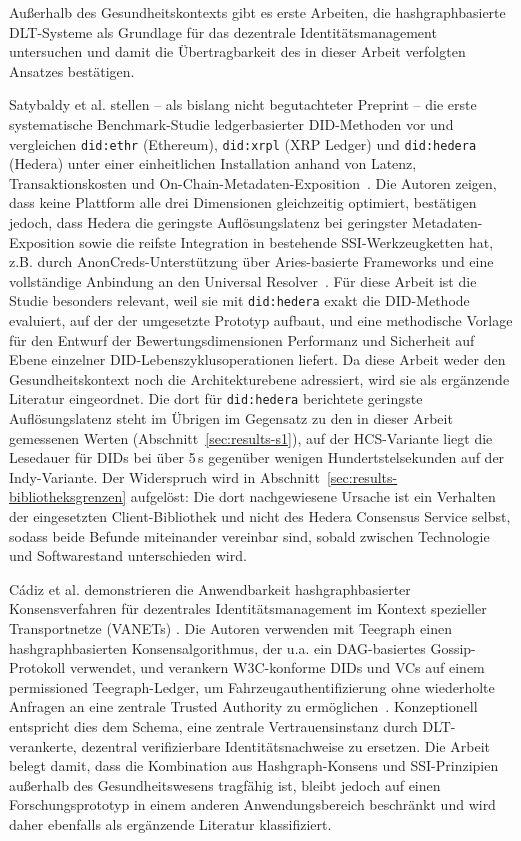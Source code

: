 Außerhalb des Gesundheitskontexts gibt es erste Arbeiten, die hashgraphbasierte DLT-Systeme als Grundlage für das dezentrale Identitätsmanagement untersuchen und damit die Übertragbarkeit des in dieser Arbeit verfolgten Ansatzes bestätigen.

Satybaldy et al. stellen -- als bislang nicht begutachteter Preprint -- die erste systematische Benchmark-Studie ledgerbasierter DID-Methoden vor und vergleichen \texttt{did:ethr} (Ethereum), \texttt{did:xrpl} (XRP Ledger) und \texttt{did:hedera} (Hedera) unter einer einheitlichen Installation anhand von Latenz, Transaktionskosten und On-Chain-Metadaten-Exposition~\cite{satybaldy2026}. Die Autoren zeigen, dass keine Plattform alle drei Dimensionen gleichzeitig optimiert, bestätigen jedoch, dass Hedera die geringste Auflösungslatenz bei geringster Metadaten-Exposition sowie die reifste Integration in bestehende SSI-Werkzeugketten hat, z.B. durch AnonCreds-Unterstützung über Aries-basierte Frameworks und eine vollständige Anbindung an den Universal Resolver~\cite{satybaldy2026}. Für diese Arbeit ist die Studie besonders relevant, weil sie mit \texttt{did:hedera} exakt die DID-Methode evaluiert, auf der der umgesetzte Prototyp aufbaut, und eine methodische Vorlage für den Entwurf der Bewertungsdimensionen Performanz und Sicherheit auf Ebene einzelner DID-Lebenszyklusoperationen liefert. Da diese Arbeit weder den Gesundheitskontext noch die Architekturebene adressiert, wird sie als ergänzende Literatur eingeordnet. Die dort für \texttt{did:hedera} berichtete geringste Auflösungslatenz steht im Übrigen im Gegensatz zu den in dieser Arbeit gemessenen Werten (Abschnitt~\ref{sec:results-s1}), auf der HCS-Variante liegt die Lesedauer für DIDs bei über 5\,s gegenüber wenigen Hundertstelsekunden auf der Indy-Variante. Der Widerspruch wird in Abschnitt~\ref{sec:results-bibliotheksgrenzen} aufgelöst: Die dort nachgewiesene Ursache ist ein Verhalten der eingesetzten Client-Bibliothek und nicht des Hedera Consensus Service selbst, sodass beide Befunde miteinander vereinbar sind, sobald zwischen Technologie und Softwarestand unterschieden wird.

Cádiz et al. demonstrieren die Anwendbarkeit hashgraphbasierter Konsensverfahren für dezentrales Identitätsmanagement im Kontext spezieller Transportnetze (VANETs) \cite{cadiz2025}. Die Autoren verwenden mit Teegraph einen hashgraphbasierten Konsensalgorithmus, der u.a. ein DAG-basiertes Gossip-Protokoll verwendet, und verankern W3C-konforme DIDs und VCs auf einem permissioned Teegraph-Ledger, um Fahrzeugauthentifizierung ohne wiederholte Anfragen an eine zentrale Trusted Authority zu ermöglichen~\cite{cadiz2025}. Konzeptionell entspricht dies dem Schema, eine zentrale Vertrauensinstanz durch DLT-verankerte, dezentral verifizierbare Identitätsnachweise zu ersetzen. Die Arbeit belegt damit, dass die Kombination aus Hashgraph-Konsens und SSI-Prinzipien außerhalb des Gesundheitswesens tragfähig ist, bleibt jedoch auf einen Forschungsprototyp in einem anderen Anwendungsbereich beschränkt und wird daher ebenfalls als ergänzende Literatur klassifiziert.

